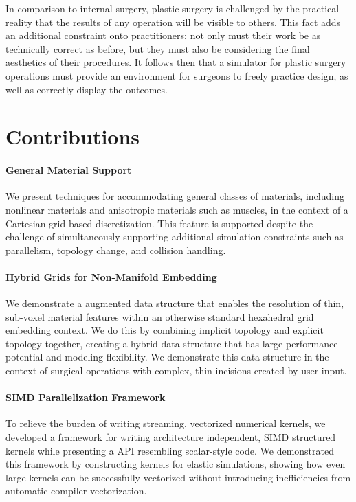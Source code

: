 In comparison to internal surgery, plastic surgery is challenged by the
practical reality that the results of any operation will be visible to
others. This fact adds an additional constraint onto practitioners;
not only must their work be as technically correct as before, but they
must also be considering the final aesthetics of their procedures. It
follows then that a simulator for plastic surgery operations must
provide an environment for surgeons to freely practice design, as well
as correctly display the outcomes.

\section{Contributions}

\paragraph{General Material Support} We present techniques for
accommodating general classes of materials, including nonlinear
materials and anisotropic materials such as muscles, in the context of
a Cartesian grid-based discretization. This feature is supported
despite the challenge of simultaneously supporting additional
simulation constraints such as parallelism, topology change, and collision handling.

\paragraph{Hybrid Grids for Non-Manifold Embedding} We demonstrate a
augmented data structure that enables the resolution of thin, sub-voxel material features
within an otherwise standard hexahedral grid embedding context. We do
this by combining implicit topology and explicit topology together,
creating a hybrid data structure that has large performance potential
and modeling flexibility. We demonstrate this data structure in the
context of surgical operations with complex, thin incisions created by
user input.

\paragraph{SIMD Parallelization Framework} To relieve the burden of
writing streaming, vectorized numerical kernels, we developed a
framework for writing architecture independent, SIMD structured
kernels while presenting a API resembling scalar-style code. We
demonstrated this framework by constructing kernels for elastic
simulations, showing how even large kernels can be successfully
vectorized without introducing inefficiencies from automatic compiler
vectorization.

